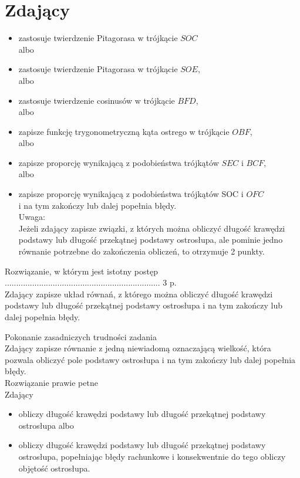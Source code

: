 \documentclass[10pt]{article}
\begin{document}
\section*{Zdający}
\begin{itemize}
  \item zastosuje twierdzenie Pitagorasa w trójkącie $S O C$\\
albo
  \item zastosuje twierdzenie Pitagorasa w trójkącie $S O E$,\\
albo
  \item zastosuje twierdzenie cosinusów w trójkącie $B F D$,\\
albo
  \item zapisze funkcję trygonometryczną kąta ostrego w trójkącie $O B F$,\\
albo
  \item zapisze proporcję wynikającą z podobieństwa trójkątów $S E C$ i $B C F$,\\
albo
  \item zapisze proporcję wynikającą z podobieństwa trójkątów SOC i $O F C$\\
i na tym zakończy lub dalej popełnia błędy.\\
Uwaga:\\
Jeżeli zdający zapisze związki, z których można obliczyć długość krawędzi podstawy lub długość przekątnej podstawy ostrosłupa, ale pominie jedno równanie potrzebne do zakończenia obliczeń, to otrzymuje 2 punkty.
\end{itemize}

Rozwiązanie, w którym jest istotny postęp .................................................................... 3 p.\\
Zdający zapisze układ równań, z którego można obliczyć długość krawędzi podstawy lub długość przekątnej podstawy ostrosłupa i na tym zakończy lub dalej popełnia błędy.

Pokonanie zasadniczych trudności zadania\\
Zdający zapisze równanie z jedną niewiadomą oznaczającą wielkość, która pozwala obliczyć pole podstawy ostrosłupa i na tym zakończy lub dalej popełnia błędy.\\
Rozwiązanie prawie petne\\
Zdający

\begin{itemize}
  \item obliczy długość krawędzi podstawy lub długość przekątnej podstawy ostrosłupa albo
  \item obliczy długość krawędzi podstawy lub długość przekątnej podstawy ostrosłupa, popełniając błędy rachunkowe i konsekwentnie do tego obliczy objętość ostrosłupa.
\end{itemize}
\end{document}
